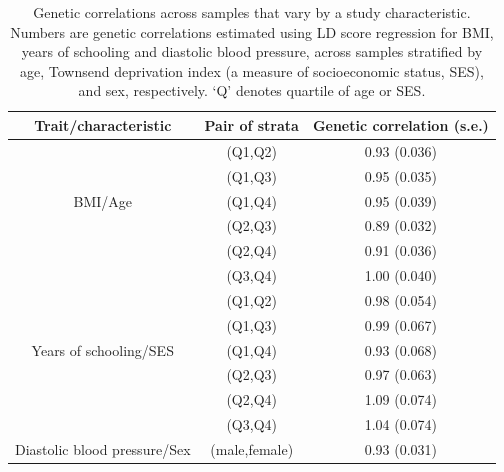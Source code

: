 \documentclass[hidelinks, 12pt]{article}
\begin{document}
\pagebreak

\begin{table}[h]
\caption[Genetic correlations across samples that vary by a study characteristic.]{\small Genetic correlations across samples that vary by a study characteristic. Numbers are genetic correlations estimated using LD score regression for BMI, years of schooling and diastolic blood pressure, across samples stratified by age, Townsend deprivation index (a measure of socioeconomic status, SES), and sex, respectively. ‘Q’ denotes quartile of age or SES.}
\begin{center}
 \begin{tabular}{|c | c | c |} 
 \hline
 \textbf{Trait/characteristic} & \textbf{Pair of strata} & \textbf{Genetic correlation (s.e.)} \\ [0.5ex] 
 \hline\hline
   & (Q1,Q2) & 0.93 (0.036)  \\ 
   & (Q1,Q3) & 0.95 (0.035)  \\ 
 BMI/Age & (Q1,Q4) & 0.95 (0.039)  \\ 
   & (Q2,Q3) & 0.89 (0.032)  \\ 
   & (Q2,Q4) & 0.91 (0.036)  \\ 
   & (Q3,Q4) & 1.00 (0.040)  \\ 
 \hline\hline
  & (Q1,Q2) & 0.98 (0.054)  \\ 
  & (Q1,Q3) & 0.99 (0.067)  \\ 
 Years of schooling/SES & (Q1,Q4) & 0.93 (0.068)  \\ 
  & (Q2,Q3) & 0.97 (0.063)  \\ 
  & (Q2,Q4) & 1.09 (0.074)  \\ 
  & (Q3,Q4) & 1.04 (0.074)  \\ 
 \hline\hline
 Diastolic blood pressure/Sex & (male,female) & 0.93 (0.031)  \\ 
 \hline
 \end{tabular}
 \end{center}
\end{table}

\pagebreak
\end{document}
